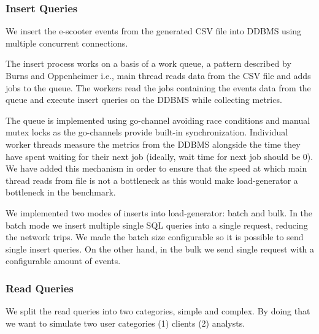 \subsubsection{Insert Queries}
We insert the e-scooter events from the generated CSV file into DDBMS using multiple concurrent connections.

The insert process works on a basis of a work queue, a pattern described by Burns and Oppenheimer \cite{196346} i.e., main thread reads data from the CSV file and adds jobs to the queue.
The workers read the jobs containing the events data from the queue and execute insert queries on the DDBMS while collecting metrics.

The queue is implemented using go-channel avoiding race conditions and manual mutex locks as the go-channels provide built-in synchronization.
Individual worker threads measure the metrics from the DDBMS alongside the time they have spent waiting for their next job (ideally, wait time for next job should be 0).
We have added this mechanism in order to ensure that the speed at which main thread reads from file is not a bottleneck as this would make load-generator a bottleneck in the benchmark.

We implemented two modes of inserts into load-generator: batch and bulk.
In the batch mode we insert multiple single SQL queries into a single request, reducing the network trips.
We made the batch size configurable so it is possible to send single insert queries.
On the other hand, in the bulk we send single request with a configurable amount of events.

\subsubsection{Read Queries}

We split the read queries into two categories, simple and complex.
By doing that we want to simulate two user categories (1) clients (2) analysts.


